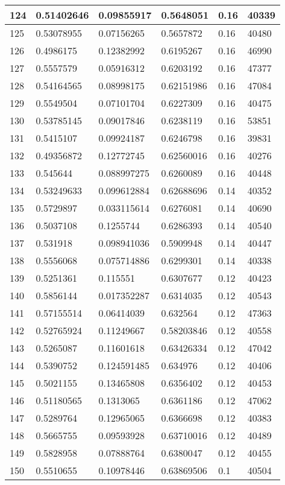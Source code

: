 \begin{longtable}{|l|l|l|l|l|l|}
124 & 0.51402646 & 0.09855917 & 0.5648051 & 0.16 & 40339 \\ \hline 
125 & 0.53078955 & 0.07156265 & 0.5657872 & 0.16 & 40480 \\ \hline 
126 & 0.4986175 & 0.12382992 & 0.6195267 & 0.16 & 46990 \\ \hline 
127 & 0.5557579 & 0.05916312 & 0.6203192 & 0.16 & 47377 \\ \hline 
128 & 0.54164565 & 0.08998175 & 0.62151986 & 0.16 & 47084 \\ \hline 
129 & 0.5549504 & 0.07101704 & 0.6227309 & 0.16 & 40475 \\ \hline 
130 & 0.53785145 & 0.09017846 & 0.6238119 & 0.16 & 53851 \\ \hline 
131 & 0.5415107 & 0.09924187 & 0.6246798 & 0.16 & 39831 \\ \hline 
132 & 0.49356872 & 0.12772745 & 0.62560016 & 0.16 & 40276 \\ \hline 
133 & 0.545644 & 0.088997275 & 0.6260089 & 0.16 & 40448 \\ \hline 
134 & 0.53249633 & 0.099612884 & 0.62688696 & 0.14 & 40352 \\ \hline 
135 & 0.5729897 & 0.033115614 & 0.6276081 & 0.14 & 40690 \\ \hline 
136 & 0.5037108 & 0.1255744 & 0.6286393 & 0.14 & 40540 \\ \hline 
137 & 0.531918 & 0.098941036 & 0.5909948 & 0.14 & 40447 \\ \hline 
138 & 0.5556068 & 0.075714886 & 0.6299301 & 0.14 & 40338 \\ \hline 
139 & 0.5251361 & 0.115551 & 0.6307677 & 0.12 & 40423 \\ \hline 
140 & 0.5856144 & 0.017352287 & 0.6314035 & 0.12 & 40543 \\ \hline 
141 & 0.57155514 & 0.06414039 & 0.632564 & 0.12 & 47363 \\ \hline 
142 & 0.52765924 & 0.11249667 & 0.58203846 & 0.12 & 40558 \\ \hline 
143 & 0.5265087 & 0.11601618 & 0.63426334 & 0.12 & 47042 \\ \hline 
144 & 0.5390752 & 0.124591485 & 0.634976 & 0.12 & 40406 \\ \hline 
145 & 0.5021155 & 0.13465808 & 0.6356402 & 0.12 & 40453 \\ \hline 
146 & 0.51180565 & 0.1313065 & 0.6361186 & 0.12 & 47062 \\ \hline 
147 & 0.5289764 & 0.12965065 & 0.6366698 & 0.12 & 40383 \\ \hline 
148 & 0.5665755 & 0.09593928 & 0.63710016 & 0.12 & 40489 \\ \hline 
149 & 0.5828958 & 0.07888764 & 0.6380047 & 0.12 & 40455 \\ \hline 
150 & 0.5510655 & 0.10978446 & 0.63869506 & 0.1 & 40504 \\ \hline 
\end{longtable}